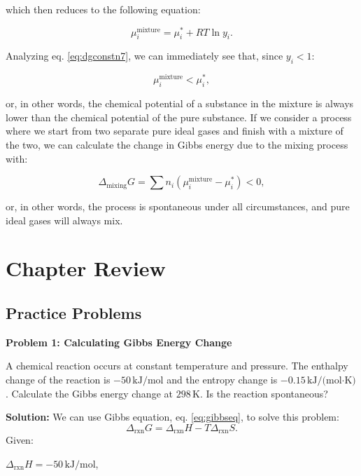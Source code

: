 \documentclass[
  9pt,
]{extbook}
\theoremstyle{definition}
\theoremstyle{definition}
\theoremstyle{definition}
\theoremstyle{definition}
\theoremstyle{remark}
\begin{document}
which then reduces to the following equation:

\begin{equation}
\mu_i^{\text{mixture}} = \mu_i^* + RT \ln y_i.
\label{eq:dgconstn7}
\end{equation}

Analyzing eq. \eqref{eq:dgconstn7}, we can immediately see that, since \(y_i < 1\):

\begin{equation}
\mu_i^{\text{mixture}} < \mu_i^*,
\label{eq:dgconstn8}
\end{equation}

or, in other words, the chemical potential of a substance in the mixture is always lower than the chemical potential of the pure substance. If we consider a process where we start from two separate pure ideal gases and finish with a mixture of the two, we can calculate the change in Gibbs energy due to the mixing process with:

\begin{equation}
\Delta_{\text{mixing}} G = \sum n_i \left( \mu_i^{\text{mixture}} - \mu_i^* \right)  < 0,
\label{eq:dgconstn9}
\end{equation}

or, in other words, the process is spontaneous under all circumstances, and pure ideal gases will always mix.

\section{Chapter Review}\label{rev9}

\subsection{Practice Problems}\label{exer9}

\textbf{Problem 1: Calculating Gibbs Energy Change}

A chemical reaction occurs at constant temperature and pressure. The enthalpy change of the reaction is \(-50\,\text{kJ/mol}\) and the entropy change is \(-0.15\,\text{kJ/(mol·K)}\). Calculate the Gibbs energy change at \(298\,\text{K}\). Is the reaction spontaneous?

\textbf{Solution:} We can use Gibbs equation, eq. \eqref{eq:gibbseq}, to solve this problem:
\[\Delta_{\text{rxn}} G= \Delta_{\text{rxn}} H - T\Delta_{\text{rxn}} S.\]
Given:

\(\Delta_{\text{rxn}} H = -50\,\text{kJ/mol}\),
\end{document}
